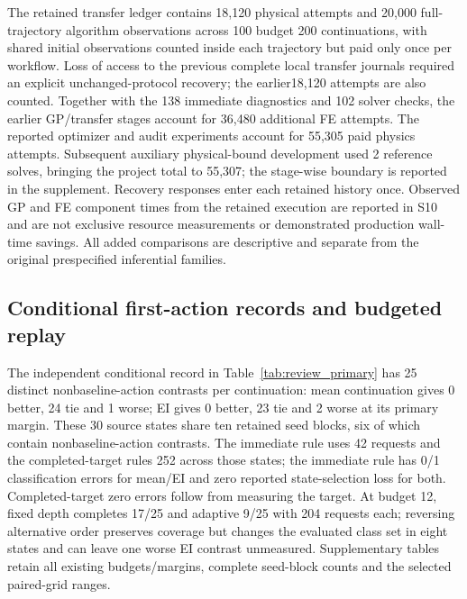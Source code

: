 \documentclass[]{interact}
\begin{document}
The retained transfer ledger contains 18,120 physical attempts and 20,000 full-trajectory algorithm observations across 100 budget 200 continuations, with shared initial observations counted inside each trajectory but paid only once per workflow. Loss of access to the previous complete local transfer journals required an explicit unchanged-protocol recovery; the earlier18,120 attempts are also counted. Together with the 138 immediate diagnostics and 102 solver checks, the earlier GP/transfer stages account for 36,480 additional FE attempts. The reported optimizer and audit experiments account for 55,305 paid physics attempts. Subsequent auxiliary physical-bound development used 2 reference solves, bringing the project total to 55,307; the stage-wise boundary is reported in the supplement. Recovery responses enter each retained history once. Observed GP and FE component times from the retained execution are reported in S10 and are not exclusive resource measurements or demonstrated production wall-time savings. All added comparisons are descriptive and separate from the original prespecified inferential families.


\subsection{Conditional first-action records and budgeted replay}\label{conditional-first-action-records}

The independent conditional record in Table~\ref{tab:review_primary} has 25 distinct nonbaseline-action contrasts per continuation: mean continuation gives 0 better, 24 tie and 1 worse; EI gives 0 better, 23 tie and 2 worse at its primary margin. These 30 source states share ten retained seed blocks, six of which contain nonbaseline-action contrasts. The immediate rule uses 42 requests and the completed-target rules 252 across those states; the immediate rule has 0/1 classification errors for mean/EI and zero reported state-selection loss for both. Completed-target zero errors follow from measuring the target. At budget 12, fixed depth completes 17/25 and adaptive 9/25 with 204 requests each; reversing alternative order preserves coverage but changes the evaluated class set in eight states and can leave one worse EI contrast unmeasured. Supplementary tables retain all existing budgets/margins, complete seed-block counts and the selected paired-grid ranges.


\end{document}

